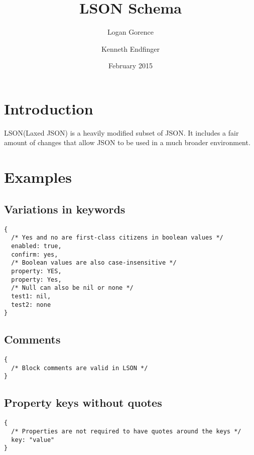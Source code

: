 \documentclass[12pt]{article}
\begin{document}
\title{LSON Schema}
\author{Logan Gorence \and Kenneth Endfinger}
\date{February 2015}
\maketitle
{}
\newpage

\tableofcontents
\newpage

\section{Introduction}
LSON(Laxed JSON) is a heavily modified subset of JSON. It includes a fair amount of changes that allow JSON to be used in a much  broader environment.
\section{Examples}
\subsection{Variations in keywords}
\begin{lstlisting}
{
  /* Yes and no are first-class citizens in boolean values */
  enabled: true,
  confirm: yes,
  /* Boolean values are also case-insensitive */
  property: YES,
  property: Yes,
  /* Null can also be nil or none */
  test1: nil,
  test2: none
}
\end{lstlisting}
\subsection{Comments}
\begin{lstlisting}
{
  /* Block comments are valid in LSON */
}
\end{lstlisting}
\subsection{Property keys without quotes}
\begin{lstlisting}
{
  /* Properties are not required to have quotes around the keys */
  key: "value"
}
\end{lstlisting}
\end{document}
